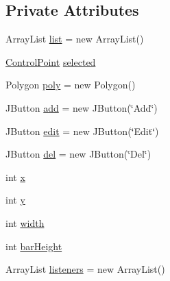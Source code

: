\subsection*{Private Attributes}
\begin{DoxyCompactItemize}
\item 
Array\+List \mbox{\hyperlink{classorg_1_1newdawn_1_1slick_1_1tools_1_1peditor_1_1_gradient_editor_aa53704ef8438035eb76c8c6aab8af133}{list}} = new Array\+List()
\item 
\mbox{\hyperlink{classorg_1_1newdawn_1_1slick_1_1tools_1_1peditor_1_1_gradient_editor_1_1_control_point}{Control\+Point}} \mbox{\hyperlink{classorg_1_1newdawn_1_1slick_1_1tools_1_1peditor_1_1_gradient_editor_a54ab0ad96c4492a2ccfd517dfcfe535b}{selected}}
\item 
Polygon \mbox{\hyperlink{classorg_1_1newdawn_1_1slick_1_1tools_1_1peditor_1_1_gradient_editor_a6e7199a584080d3a2f3d59bf5bd27d46}{poly}} = new Polygon()
\item 
J\+Button \mbox{\hyperlink{classorg_1_1newdawn_1_1slick_1_1tools_1_1peditor_1_1_gradient_editor_a77f7e806abe45619991ba5157e22340f}{add}} = new J\+Button(\char`\"{}Add\char`\"{})
\item 
J\+Button \mbox{\hyperlink{classorg_1_1newdawn_1_1slick_1_1tools_1_1peditor_1_1_gradient_editor_afb901960c0b3f04b31be91a2ed5409e5}{edit}} = new J\+Button(\char`\"{}Edit\char`\"{})
\item 
J\+Button \mbox{\hyperlink{classorg_1_1newdawn_1_1slick_1_1tools_1_1peditor_1_1_gradient_editor_a9b781a79fe6c912ac71d98253f27d492}{del}} = new J\+Button(\char`\"{}Del\char`\"{})
\item 
int \mbox{\hyperlink{classorg_1_1newdawn_1_1slick_1_1tools_1_1peditor_1_1_gradient_editor_a46d6dd575e884f37be11c21338aa5639}{x}}
\item 
int \mbox{\hyperlink{classorg_1_1newdawn_1_1slick_1_1tools_1_1peditor_1_1_gradient_editor_a605dc2215c81a31e3674145d934663d7}{y}}
\item 
int \mbox{\hyperlink{classorg_1_1newdawn_1_1slick_1_1tools_1_1peditor_1_1_gradient_editor_a431cbdce1e6958b08afe9c1f874919fe}{width}}
\item 
int \mbox{\hyperlink{classorg_1_1newdawn_1_1slick_1_1tools_1_1peditor_1_1_gradient_editor_a4f94b55909f5c27ed04486c9f5a5c422}{bar\+Height}}
\item 
Array\+List \mbox{\hyperlink{classorg_1_1newdawn_1_1slick_1_1tools_1_1peditor_1_1_gradient_editor_a9df94248f3547e312d52a7d3fd3568f5}{listeners}} = new Array\+List()
\end{DoxyCompactItemize}


